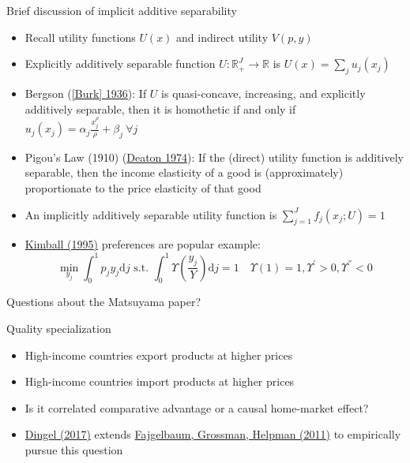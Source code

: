 \documentclass[10pt,notes=hide]{beamer}
\begin{document}
\begin{frame}{Brief discussion of implicit additive separability}
\begin{itemize}
	\item Recall utility functions $U(x)$ and indirect utility $V(p,y)$
	\item Explicitly additively separable function $U: \mathbb{R}_{+}^{J} \to \mathbb{R}$ is $U(x) = \sum_j u_j(x_j)$
	\item Bergson (\href{https://www.jstor.org/stable/2967658}{[Burk] 1936}): If $U$ is quasi-concave, increasing, and explicitly additively separable,
	then it is homothetic if and only if
	$u_j(x_j) = \alpha_j \frac{x_j^{\rho}}{\rho} + \beta_j \ \forall j$
	\item Pigou's Law (1910) (\href{https://www.jstor.org/stable/2231258}{Deaton 1974}): If the (direct) utility function is additively separable, then the income elasticity of a good is (approximately) proportionate to the price elasticity of that good
	\item An implicitly additively separable utility function is
	$\sum_{j=1}^{J} f_j\left(x_j; U\right)=1$
	\item \href{https://ideas.repec.org/a/mcb/jmoncb/v27y1995i4p1241-77.html}{Kimball (1995)} preferences are popular example:
	$$
	\min_{y_j} \int_{0}^{1} p_j y_j \textrm{d}j \text{ s.t. } \int_{0}^{1} \Upsilon \left(\frac{y_j}{Y}\right) \textrm{d}j = 1 
	\quad \Upsilon(1) = 1, \Upsilon^{'}>0, \Upsilon^{''}<0
	$$
\end{itemize}
Questions about the Matsuyama paper?
\end{frame}
\begin{frame}{Quality specialization}
\begin{itemize}
	\item High-income countries export products at higher prices
	\item High-income countries import products at higher prices
	\item Is it correlated comparative advantage or a causal home-market effect?
	\item \href{https://academic.oup.com/restud/article/84/4/1551/2684498}{Dingel (2017)} extends \href{http://www.journals.uchicago.edu/doi/abs/10.1086/662628}{Fajgelbaum, Grossman, Helpman (2011)} to empirically pursue this question
\end{itemize}
\end{frame}
\end{document}

